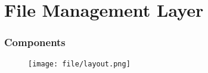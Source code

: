 \section{File Management Layer}

\begin{frame}
    \frametitle{ Components}
    \begin{figure}
        \centering
        \texttt{[image: file/layout.png]} %
        \caption{}
    \end{figure}
\end{frame}





